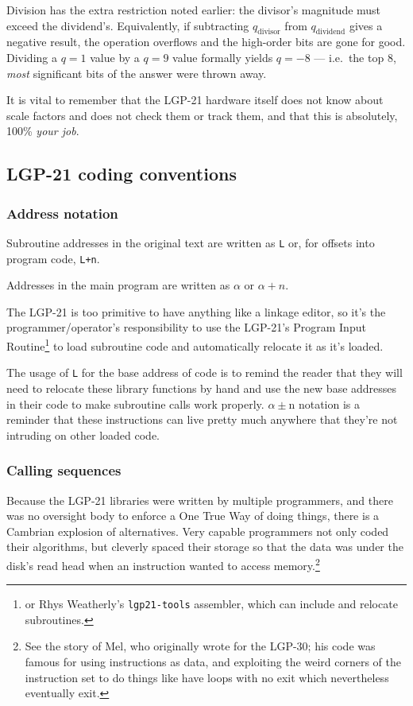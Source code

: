 Division has the extra restriction noted earlier: the divisor's magnitude must exceed the dividend's. Equivalently, if subtracting $q_\text{divisor}$ from $q_\text{dividend}$ gives a negative result, the operation overflows and the high-order bits are gone for good. Dividing a $q=1$ value by a $q=9$ value formally yields $q=-8$ --- i.e.\ the top 8, \emph{most} significant bits of the answer were thrown away.
 
It is vital to remember that the LGP-21 hardware itself does not know about scale factors and does not check them or track them, and that this is absolutely, 100\% \emph{your job}.

\subsection{LGP-21 coding conventions}
\subsubsection{Address notation}
Subroutine addresses in the original text are written as \texttt{L} or, for offsets into program code,  \texttt{L+n}. 

Addresses in the main program are written as $\alpha$ or $\alpha+n$.

The LGP-21 is too primitive to have anything like a linkage editor, so it's the programmer/operator's responsibility to use the LGP-21's Program Input Routine\footnote{or Rhys Weatherly's \texttt{lgp21-tools} assembler, which can include and relocate subroutines.} to load subroutine code and automatically relocate it as it's loaded. 

The usage of \texttt{L} for the base address of code is to remind the reader that they will need to relocate these library functions by hand and use the new base addresses
in their code to make subroutine calls work properly. $\alpha\pm$n notation is a reminder that these instructions can live pretty much anywhere that they're not intruding on other loaded code.

\subsubsection{Calling sequences}
Because the LGP-21 libraries were written by multiple programmers, and there was no oversight body to enforce a One True Way of doing things, there is a Cambrian explosion of alternatives. Very capable programmers not only coded their algorithms, but cleverly spaced their storage so that the data was under the disk's read head when an instruction wanted to access memory.\footnote{See the story of Mel\cite{storyofmel}, who originally wrote for the LGP-30; his code was famous for using instructions as data, and exploiting the weird corners of the instruction set to do things like have loops with no exit which nevertheless eventually exit.}

